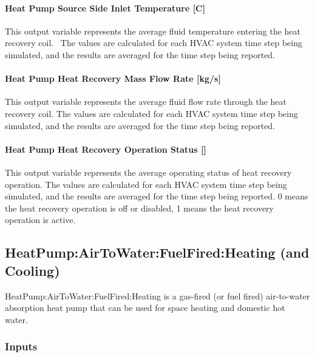 \paragraph{Heat Pump Source Side Inlet Temperature {[}C{]}}\label{air-to-water-heat-pump-source-side-inlet-temperature-c}

This output variable represents the average fluid temperature entering the heat recovery coil.~ The values are calculated for each HVAC system time step being simulated, and the results are averaged for the time step being reported.

\paragraph{Heat Pump Heat Recovery Mass Flow Rate {[}kg/s{]}}\label{air-to-water-heat-pump-heat-recovery-mass-flow-rate-kgs}

This output variable represents the average fluid flow rate through the heat recovery coil. The values are calculated for each HVAC system time step being simulated, and the results are averaged for the time step being reported.

\paragraph{Heat Pump Heat Recovery Operation Status {[}{]}}\label{air-to-water-heat-pump-heat-recovery-operating-status}

This output variable represents the average operating status of heat recovery operation. The values are calculated for each HVAC system time step being simulated, and the results are averaged for the time step being reported. 0 means the heat recovery operation is off or disabled, 1 means the heat recovery operation is active.


\subsection{HeatPump:AirToWater:FuelFired:Heating (and Cooling)}\label{plhp_fuelfired}

HeatPump:AirToWater:FuelFired:Heating is a gas-fired (or fuel fired) air-to-water absorption heat pump that can be used for space heating and domestic hot water.

\subsubsection{Inputs}

